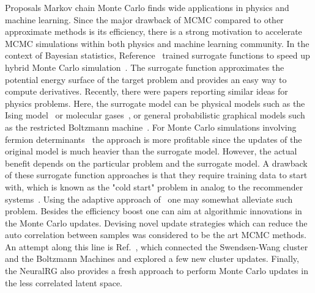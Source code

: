 \documentclass[aps,prb,floatfix,amsmath,amssymb,amsfonts,10pt,floatfix,longbibliography]{revtex4-1}
\begin{document}
\begin{enumerate}
\begin{enumerate}
Proposals\cite{Liu2017b}\cite{Xu2017}\cite{Huang2017}
Markov chain Monte Carlo finds wide applications in physics and machine learning. Since the major drawback of MCMC compared to other approximate methods is its efficiency, there is a strong motivation to accelerate MCMC simulations within both physics and machine learning community. In the context of Bayesian statistics, Reference~\cite{Rasmussen2003} trained surrogate functions to speed up hybrid Monte Carlo simulation~\cite{Duane1987}. The surrogate function approximates the potential energy surface of the target problem and provides an easy way to compute derivatives. Recently, there were papers reporting similar ideas for physics problems. Here, the surrogate model can be physical models such as the Ising model~\cite{Liu2017a} or molecular gases~\cite{Huang2017b}, or general probabilistic graphical models such as the restricted Boltzmann machine~\cite{Huang2017a}. For Monte Carlo simulations involving fermion determinants~\cite{Huang2017b, Liu2017fermion} the approach is more profitable since the updates of the original model is much heavier than the surrogate model. However, the actual benefit depends on the particular problem and the surrogate model. A drawback of these surrogate function approaches is that they require training data to start with, which is known as the "cold start" problem in analog to the recommender systems~\cite{Huang2017b}. Using the adaptive approach of~\cite{AdvancedMCMC} one may somewhat alleviate such problem. 
Besides the efficiency boost one can aim at algorithmic innovations in the Monte Carlo updates. Devising novel update strategies which can reduce the auto correlation between samples was considered to be the art MCMC methods. An attempt along this line is Ref.~\cite{Wang2017}, which connected the Swendsen-Wang cluster and the Boltzmann Machines and explored a few new cluster updates. Finally, the NeuralRG \cite{NeuralRG} also provides a fresh approach to perform Monte Carlo updates in the less correlated latent space.


\end{enumerate}
\end{enumerate}
\end{document}
